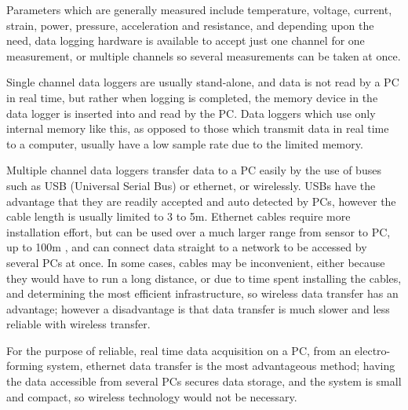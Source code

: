 Parameters which are generally measured include temperature, voltage, current, strain, power, pressure, acceleration and resistance, and depending upon the need, data logging hardware is available to accept just one channel for one measurement, or multiple channels so several measurements can be taken at once. 

Single channel data loggers are usually stand-alone, and data is not read by a PC in real time, but rather when logging is completed, the memory device in the data logger is inserted into and read by the PC. Data loggers which use only internal memory like this, as opposed to those which transmit data in real time to a computer, usually have a low sample rate due to the limited memory.

Multiple channel data loggers transfer data to a PC easily by the use of buses such as USB (Universal Serial Bus) or ethernet, or wirelessly. USBs have the advantage that they are readily accepted and auto detected by PCs, however the cable length is usually limited to 3 to 5m. Ethernet cables require more installation effort, but can be used over a much larger range from sensor to PC, up to 100m \cite{NatInstruments}, and can connect data straight to a network to be accessed by several PCs at once. In some cases, cables may be inconvenient, either because they would have to run a long distance, or due to time spent installing the cables, and determining the most efficient infrastructure, so wireless data transfer has an advantage; however a disadvantage is that data transfer is much slower and less reliable with wireless transfer.

For the purpose of reliable, real time data acquisition on a PC, from an electro-forming system, ethernet data transfer is the most advantageous method; having the data accessible from several PCs secures data storage, and the system is small and compact, so wireless technology would not be necessary. 

